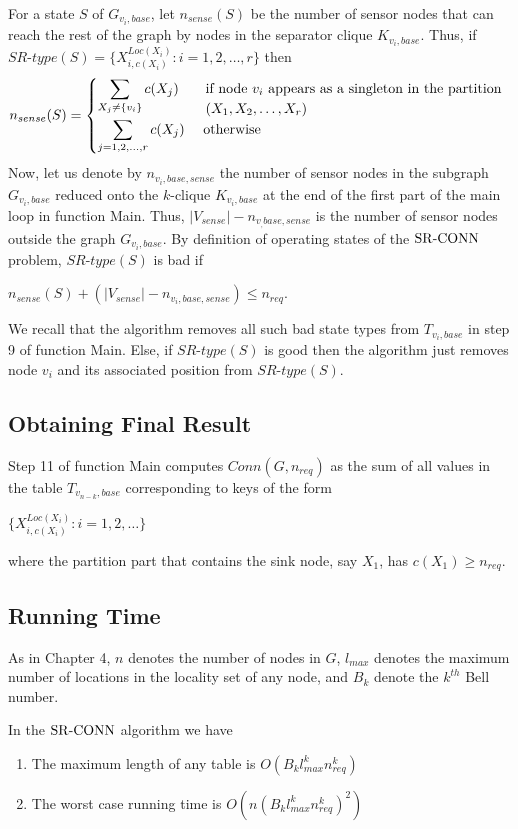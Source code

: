 For a state $S$ of $G_{v_i,base}$, let $n_{sense}(S)$ be the number of sensor nodes that can reach the rest of the graph by nodes in the separator clique $K_{v_i,base}$.
Thus, if $SR\mbox{-}type(S)=\{X_{i,c(X_i)}^{Loc(X_i)}: i=1,2, \ldots,r\}$  then
\nwline
\[
 n_{sense}(S) =
  \begin{cases}
   \displaystyle\sum_{X_j\neq\{v_i\}} c(X_j)  & 
   \begin{array}[t]{l}
   \mbox{if node } v_i \mbox{ appears as a singleton in the partition}\\ (X_1,X_2,\ldots,X_r)
    \end{array}\\
   \displaystyle\sum_{j=1,2,\ldots,r}  c(X_j)   & \mbox{ otherwise}
  \end{cases}
\]
\nwline
Now, let us denote by $n_{v_i,base,sense}$ the number of sensor nodes in the  subgraph $G_{v_i,base}$ reduced onto the $k$-clique $K_{v_i,base}$ at the end of the first part of the main loop in function Main. Thus, $|V_{sense}|-n_{v_,base,sense}$ is the number of sensor nodes outside the graph $G_{v_i,base}$.
By definition of operating states of the ${\mathrm {SR\mbox{-}CONN}}$ problem, $SR\mbox{-}type(S)$ is bad if 

\centerline{$n_{sense}(S)+(|V_{sense}|-n_{v_i,base,sense})\leq n_{req}$.}


We recall that the algorithm removes all such bad state types from $T_{v_i,base}$ in step 9 of function Main. Else, if $SR\mbox{-}type(S)$ is good then the algorithm just removes node $v_i$ and its associated position from $SR\mbox{-}type(S)$.

\subsection{Obtaining Final Result}
\label{subsec:ofr1}
Step 11 of function Main computes $Conn(G,n_{req})$ as the sum of all values in the table $T_{v_{n-k},base}$ corresponding to keys of the form \\
\nwline
\centerline{
$\{X_{i,c(X_i)}^{Loc(X_i)} : i=1,2, \ldots\}$}
\nwline
where the partition part that contains the sink node, say $X_1$, has $c(X_1)\geq n_{req}$.

\subsection{Running Time}
\label{subsec:rt1}
As in Chapter 4, $n$ denotes the number of nodes in $G$, $l_{max}$ denotes the maximum number of locations in the locality set of any node, and $B_k$ denote the $k^{th}$ Bell number.
\begin{theorem}\normalfont In the ${\mathrm {SR\mbox{-}CONN}}$ algorithm we have\label{thm:rt1}
\begin{enumerate}
\item The maximum length of any table is $O(B_kl_{max}^kn_{req}^k)$ 
\item The worst case running time is $O(n(B_kl_{max}^kn_{req}^k)^2)$
\end{enumerate}
\end{theorem}

